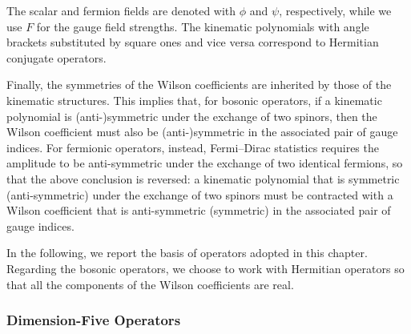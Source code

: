 The scalar and fermion fields are denoted with $\phi$ and $\psi$, respectively, while we use $F$ for the gauge field strengths. The kinematic polynomials with angle brackets substituted by square ones and vice versa correspond to Hermitian conjugate operators. 

Finally, the symmetries of the Wilson coefficients are inherited by those of the kinematic structures.
This implies that, for bosonic operators, if a kinematic polynomial is (anti-)symmetric under the exchange of two spinors, then the Wilson coefficient must also be (anti-)symmetric in the associated pair of gauge indices.
For fermionic operators, instead, Fermi--Dirac statistics requires the amplitude to be anti-symmetric under the exchange of two identical fermions, so that the above conclusion is reversed: a kinematic polynomial that is symmetric (anti-symmetric) under the exchange of two spinors must be contracted with a Wilson coefficient that is anti-symmetric (symmetric) in the associated pair of gauge indices.

In the following, we report the basis of operators adopted in this chapter.
Regarding the bosonic operators, we choose to work with Hermitian operators so that all the components of the Wilson coefficients are real.


\subsubsection{Dimension-Five Operators}


